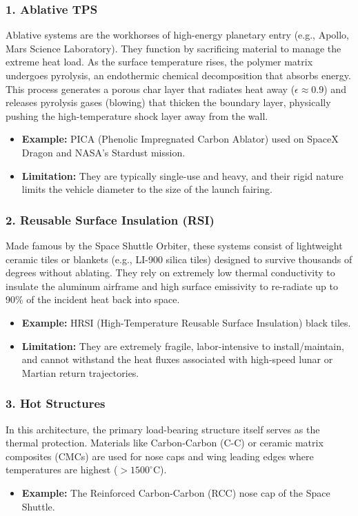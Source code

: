 \subsubsection*{1. Ablative TPS}
Ablative systems are the workhorses of high-energy planetary entry (e.g., Apollo, Mars Science Laboratory). They function by sacrificing material to manage the extreme heat load. As the surface temperature rises, the polymer matrix undergoes pyrolysis, an endothermic chemical decomposition that absorbs energy. This process generates a porous char layer that radiates heat away ($\epsilon \approx 0.9$) and releases pyrolysis gases (blowing) that thicken the boundary layer, physically pushing the high-temperature shock layer away from the wall.
\begin{itemize}
    \item \textbf{Example:} PICA (Phenolic Impregnated Carbon Ablator) used on SpaceX Dragon and NASA's Stardust mission.
    \item \textbf{Limitation:} They are typically single-use and heavy, and their rigid nature limits the vehicle diameter to the size of the launch fairing.
\end{itemize}



\subsubsection*{2. Reusable Surface Insulation (RSI)}
Made famous by the Space Shuttle Orbiter, these systems consist of lightweight ceramic tiles or blankets (e.g., LI-900 silica tiles) designed to survive thousands of degrees without ablating. They rely on extremely low thermal conductivity to insulate the aluminum airframe and high surface emissivity to re-radiate up to 90\% of the incident heat back into space.
\begin{itemize}
    \item \textbf{Example:} HRSI (High-Temperature Reusable Surface Insulation) black tiles.
    \item \textbf{Limitation:} They are extremely fragile, labor-intensive to install/maintain, and cannot withstand the heat fluxes associated with high-speed lunar or Martian return trajectories.
\end{itemize}

\subsubsection*{3. Hot Structures}
In this architecture, the primary load-bearing structure itself serves as the thermal protection. Materials like Carbon-Carbon (C-C) or ceramic matrix composites (CMCs) are used for nose caps and wing leading edges where temperatures are highest ($> 1500^\circ$C).
\begin{itemize}
    \item \textbf{Example:} The Reinforced Carbon-Carbon (RCC) nose cap of the Space Shuttle.
\end{itemize}

